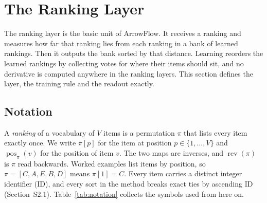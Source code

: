 \section{The Ranking Layer}\label{sec:ranking-layer}

The ranking layer is the basic unit of ArrowFlow. It receives a ranking and measures how far that ranking lies from each ranking in a bank of learned rankings. Then it outputs the bank sorted by that distance. Learning reorders the learned rankings by collecting votes for where their items should sit, and no derivative is computed anywhere in the ranking layers. This section defines the layer, the training rule and the readout exactly.

\subsection{Notation}\label{sec:notation}

A \emph{ranking} of a vocabulary of $V$ items is a permutation $\pi$ that lists every item exactly once. We write $\pi[p]$ for the item at position $p\in\{1,\dots,V\}$ and $\operatorname{pos}_\pi(v)$ for the position of item $v$. The two maps are inverses, and $\operatorname{rev}(\pi)$ is $\pi$ read backwards. Worked examples list items by position, so $\pi=[C,A,E,B,D]$ means $\pi[1]=C$. Every item carries a distinct integer identifier (ID), and every sort in the method breaks exact ties by ascending ID (Section~S2.1). Table~\ref{tab:notation} collects the symbols used from here on.

